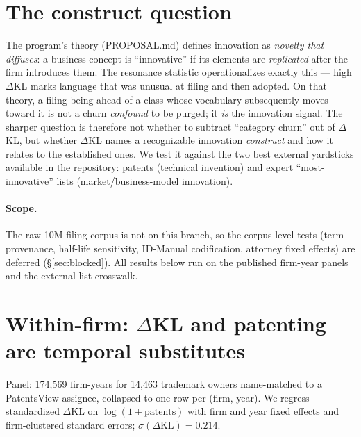 \documentclass[11pt]{report}
\newcommand{\dkl}{$\Delta$KL}
\begin{document}
\section{The construct question}
The program's theory (PROPOSAL.md) defines innovation as \emph{novelty that
diffuses}: a business concept is ``innovative'' if its elements are
\emph{replicated} after the firm introduces them. The resonance statistic
operationalizes exactly this --- high \dkl{} marks language that was unusual at
filing and then adopted. On that theory, a filing being ahead of a class whose
vocabulary subsequently moves toward it is not a churn \emph{confound} to be
purged; it \emph{is} the innovation signal. The sharper question is therefore not
whether to subtract ``category churn'' out of \dkl{}, but whether \dkl{} names a
recognizable innovation \emph{construct} and how it relates to the established
ones. We test it against the two best external yardsticks available in the
repository: patents (technical invention) and expert ``most-innovative'' lists
(market/business-model innovation).

\paragraph{Scope.} The raw 10M-filing corpus is not on this branch, so the
corpus-level tests (term provenance, half-life sensitivity, ID-Manual
codification, attorney fixed effects) are deferred (\S\ref{sec:blocked}). All
results below run on the published firm-year panels and the external-list
crosswalk.

\section{Within-firm: \dkl{} and patenting are temporal substitutes}
Panel: 174{,}569 firm-years for 14{,}463 trademark owners name-matched to a
PatentsView assignee, collapsed to one row per (firm, year). We regress
standardized \dkl{} on $\log(1+\text{patents})$ with firm and year fixed effects
and firm-clustered standard errors; $\sigma(\Delta\mathrm{KL})=0.214$.
\end{document}
